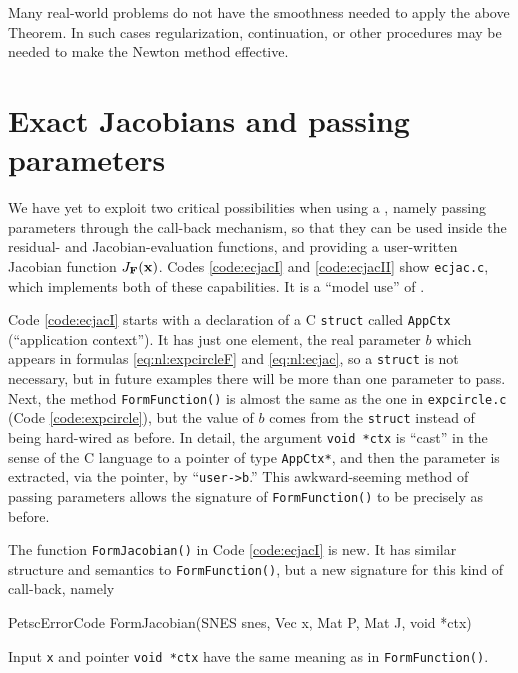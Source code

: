 Many real-world problems do not have the smoothness needed to apply the above Theorem.  In such cases regularization, continuation, or other procedures may be needed to make the Newton method effective.


\section{Exact Jacobians and passing parameters}

We have yet to exploit two critical possibilities when using a \pSNES, namely passing parameters through the call-back mechanism, so that they can be used inside the residual- and Jacobian-evaluation functions, and providing a user-written Jacobian function $J_{\mathbf{F}}(\mathbf{x})$.  Codes \ref{code:ecjacI} and \ref{code:ecjacII} show  \texttt{ecjac.c}, which implements both of these capabilities.  It is a ``model use'' of \pSNES.

Code \ref{code:ecjacI} starts with a declaration of a C \texttt{struct} called \texttt{AppCtx} (``application context'').  It has just one element, the real parameter $b$ which appears in formulas \eqref{eq:nl:expcircleF} and \eqref{eq:nl:ecjac}, so a \texttt{struct} is not necessary, but in future examples there will be more than one parameter to pass.  Next, the method \texttt{FormFunction()} is almost the same as the one in \texttt{expcircle.c} (Code \ref{code:expcircle}), but the value of $b$ comes from the \texttt{struct} instead of being hard-wired as before.  In detail, the argument \texttt{void *ctx} is ``cast'' in the sense of the C language \citep{KernighanRitchie1988} to a pointer of type \texttt{AppCtx*}, and then the parameter is extracted, via the pointer, by ``\texttt{user->b}.''  This awkward-seeming method of passing parameters allows the signature of \texttt{FormFunction()} to be precisely as before.


The function \texttt{FormJacobian()} in Code \ref{code:ecjacI} is new.  It has similar structure and semantics to \texttt{FormFunction()}, but a new signature for this kind of call-back, namely
\begin{code}
PetscErrorCode FormJacobian(SNES snes, Vec x, Mat P, Mat J, void *ctx)
\end{code}
Input \pVec \texttt{x} and pointer \texttt{void *ctx} have the same meaning as in \texttt{FormFunction()}.

